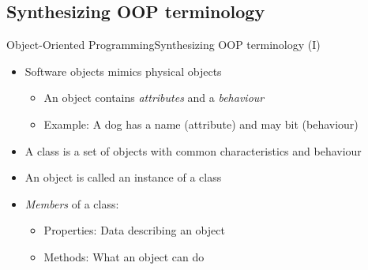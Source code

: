 \documentclass[10pt,compress]{beamer} %
\begin{document}
\subsection{Synthesizing OOP terminology}
\begin{frame}{Object-Oriented Programming}{Synthesizing OOP terminology (I)}
 		  \begin{itemize}
			\item Software objects mimics physical objects %
		   	\begin{itemize}
				\item An object contains \textit{attributes} and a \textit{behaviour} %
				\item Example: A dog has a name (attribute) and may bit (behaviour)
		  	\end{itemize}
		  	\item A \alert{class} is a set of objects with common characteristics and behaviour
		  	\item An \alert{object} is called an \alert{instance} of a class
			\item \textit{Members} of a class:
		    	\begin{itemize}
				\item \alert{Properties}: Data describing an object
				\item \alert{Methods}: What an object can do %
		  	    \end{itemize}
		  \end{itemize}
\end{frame}
\end{document}
